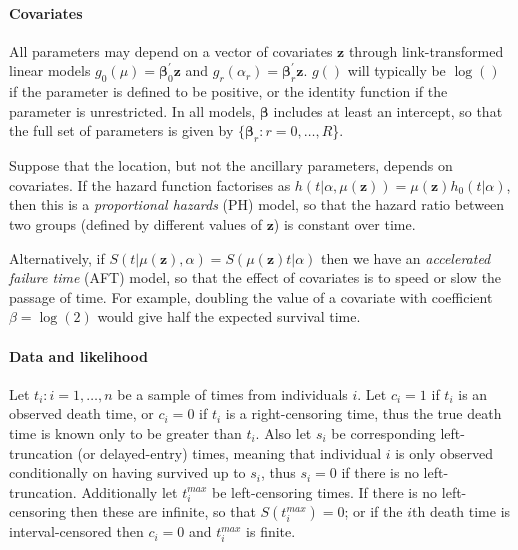 \documentclass[nojss,nofooter]{jss}
\begin{document}

\paragraph{Covariates} 

All parameters may depend on a vector of covariates $\mathbf{z}$
through link-transformed linear models $g_0(\mu) = \bm{\beta}_0^{'}
\mathbf{z}$ and $g_r(\alpha_r) = \bm{\beta}_r^{'} \mathbf{z}$. $g()$
will typically be $\log()$ if the parameter is defined to be positive,
or the identity function if the parameter is unrestricted.  In all
models, $\bm{\beta}$ includes at least an intercept, so that the full
set of parameters is given by $\{\bm{\beta}_r: r=0,\ldots,R$\}.

Suppose that the location, but not the ancillary parameters, depends
on covariates.  If the hazard function factorises as $h(t | \alpha,
\mu(\mathbf{z})) = \mu(\mathbf{z}) h_0(t | \alpha)$, then this is a
\emph{proportional hazards} (PH) model, so that the hazard ratio between
two groups (defined by different values of $\mathbf{z}$) is constant
over time.

Alternatively, if $S(t | \mu(\mathbf{z}), \alpha) =
S(\mu(\mathbf{z}) t | \alpha)$ then we have an \emph{accelerated
  failure time} (AFT) model, so that the effect of covariates is to speed or
slow the passage of time. For example, doubling the value of a
covariate with coefficient $\beta=\log(2)$ would give half the
expected survival time.


\paragraph{Data and likelihood} 

Let $t_i: i=1,\ldots, n$ be a sample of times from individuals $i$.
Let $c_i=1$ if $t_i$ is an observed death time, or $c_i=0$ if $t_i$ is
a right-censoring time, thus the true death time is known only to be
greater than $t_i$.  Also let $s_i$ be corresponding left-truncation
(or delayed-entry) times, meaning that individual $i$ is only observed
conditionally on having survived up to $s_i$, thus $s_i=0$ if there is
no left-truncation.  Additionally let $t^{max}_i$ be left-censoring
times.  If there is no left-censoring then these are infinite, so that
$S(t^{max}_i)=0$; or if the $i$th death time is interval-censored then
$c_i=0$ and $t^{max}_i$ is finite.
\end{document}

